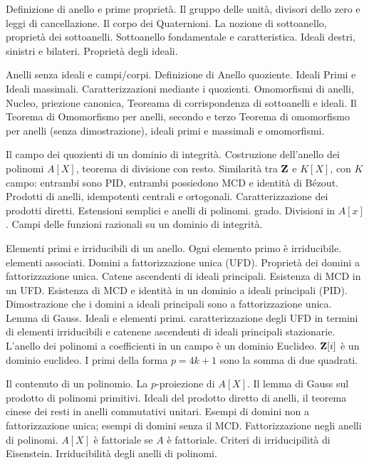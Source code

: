 Definizione di anello e prime propriet\`a. Il gruppo delle unit\`a, divisori dello zero e leggi di cancellazione. Il corpo dei Quaternioni.
La nozione di sottoanello, propriet\`a dei sottoanelli. Sottoanello fondamentale e caratteristica. 
Ideali destri, sinistri e bilateri. Propriet\`a degli ideali.

Anelli senza ideali e campi/corpi. Definizione di Anello quoziente. Ideali Primi e Ideali massimali. Caratterizzazioni mediante i quozienti. 
Omomorfismi di anelli, Nucleo, priezione canonica, Teoreama di corrispondenza di sottoanelli e ideali. 
Il Teorema di Omomorfismo per anelli, secondo e terzo Teorema di omomorfismo per anelli (senza dimostrazione), 
ideali primi e massimali e omomorfismi. 

Il campo dei quozienti di un dominio di integrit\`a.
Costruzione dell'anello dei polinomi $A[X]$, teorema di divisione con resto. 
Similarit\`a tra ${\bf Z}$ e $K[X]$, con $K$ campo: entrambi sono PID, entrambi possiedono MCD e identit\`a di B\'ezout.
Prodotti di anelli, idempotenti centrali e ortogonali. Caratterizzazione dei prodotti diretti. Estensioni semplici e anelli di polinomi. grado. Divisioni in $A[x]$. Campi delle funzioni razionali su un dominio di integrit\`a. 

Elementi primi e irriducibili di un anello. Ogni elemento primo \`e irriducibile. elementi associati. Domini a fattorizzazione unica (UFD). Propriet\`a dei domini a fattorizzazione unica. Catene ascendenti di ideali principali. Esistenza di MCD in un UFD. Esistenza di MCD e identit\`a in un dominio a ideali principali (PID). Dimostrazione che i domini a ideali principali sono a fattorizzazione unica. Lemma di Gauss. Ideali e elementi primi. caratterizzazione degli UFD in termini di elementi irriducibili e catenene ascendenti di ideali principali stazionarie. 
L'anello dei polinomi a coefficienti in un campo \`e un dominio Euclideo. ${\bf Z}[i]$ \`e un dominio euclideo. I primi della forma $p=4k+1$ sono la somma di due quadrati.

Il contenuto di un polinomio. La $p$-proiezione di $A[X]$. 
Il lemma di Gauss sul prodotto di polinomi primitivi. Ideali del prodotto diretto di anelli, il teorema cinese dei resti in anelli commutativi unitari.  Esempi di domini non a fattorizzazione unica; esempi di domini senza il MCD. 
Fattorizzazione negli anelli di polinomi. $A[X]$ \`e fattoriale se $A$ \`e fattoriale. Criteri di irriducipilit\`a di Eisenstein. Irriducibilit\`a degli anelli di polinomi.

